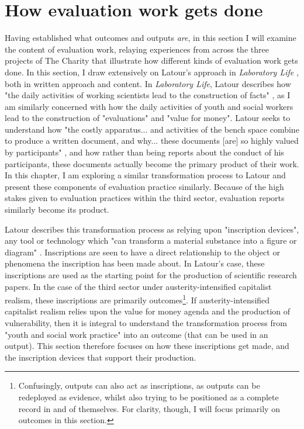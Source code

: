 \section{How evaluation work gets done}
\label{sec: 6-4-eval-work}
Having established what outcomes and outputs \emph{are}, in this section I will examine the content of evaluation work, relaying experiences from across the three projects of The Charity that illustrate how different kinds of evaluation work gets done. In this section, I draw extensively on Latour's approach in \emph{Laboratory Life} \citep{latour_laboratory_1986}, both in written approach and content. In \emph{Laboratory Life}, Latour describes how "the daily activities of working scientists lead to the construction of facts" \citep[p. 40]{latour_laboratory_1986}, as I am similarly concerned with how the daily activities of youth and social workers lead to the construction of "evaluations" and "value for money". Latour seeks to understand how "the costly apparatus... and activities of the bench space combine to produce a written document, and why... these documents [are] so highly valued by participants" \citep[p. 48]{latour_laboratory_1986}, and how rather than being reports about the conduct of his participants, these documents actually become the primary product of their work. In this chapter, I am exploring a similar transformation process to Latour and present these components of evaluation practice similarly. Because of the high stakes given to evaluation practices within the third sector, evaluation reports similarly become its product. 

Latour describes this transformation process as relying upon "inscription devices", any tool or technology which "can transform a material substance into a figure or diagram" \citep[p. 51]{latour_laboratory_1986}. Inscriptions are seen to have a direct relationship to the object or phenomena the inscription has been made about. In Latour's case, these inscriptions are used as the starting point for the production of scientific research papers. In the case of the third sector under austerity-intensified capitalist realism, these inscriptions are primarily outcomes\footnote{Confusingly, outputs can also act as inscriptions, as outputs can be redeployed as evidence, whilst also trying to be positioned as a complete record in and of themselves. For clarity, though, I will focus primarily on outcomes in this section.}.  If austerity-intensified capitalist realism relies upon the value for money agenda and the production of vulnerability, then it is integral to understand the transformation process from "youth and social work practice" into an outcome (that can be used in an output). This section therefore focuses on how  these inscriptions get made, and the inscription devices that support their production.

